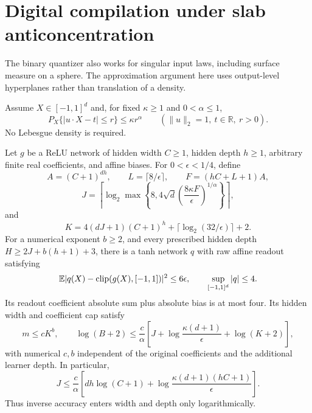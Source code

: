 \section{Digital compilation under slab anticoncentration}
\label{sec:slab-quantized-input}
The binary quantizer also works for singular input laws, including
surface measure on a sphere. The approximation argument here uses
output-level hyperplanes rather than translation of a density.

Assume $X\in[-1,1]^d$ and, for fixed $\kappa\ge1$ and
$0<\alpha\le1$,
\begin{equation}\label{eq:digital-slab-assumption}
 P_X\{|u\cdot X-t|\le r\}\le\kappa r^\alpha
 \qquad(\|u\|_2=1,\ t\in\mathbb R,\ r>0).
\end{equation}
No Lebesgue density is required.

\begin{lemma}
\label{lem:slab-quantized-compiler}
Let $g$ be a ReLU network of hidden width $C\ge1$, hidden depth
$h\ge1$, arbitrary finite real coefficients, and affine biases.
For $0<\epsilon<1/4$, define
\[
 A=(C+1)^{dh},\qquad L=\lceil8/\epsilon\rceil,
 \qquad F=(hC+L+1)A,
\]
\[
 J=\left\lceil\log_2\max\left\{8,
       4\sqrt d\left(\frac{8\kappa F}{\epsilon}\right)^{1/\alpha}
                          \right\}\right\rceil,
\]
and
\[
 K=4(dJ+1)(C+1)^h+\lceil\log_2(32/\epsilon)\rceil+2.
\]
For a numerical exponent $b\ge2$, and every prescribed hidden depth
$H\ge2J+b(h+1)+3$, there is a tanh network $q$ with raw affine
readout satisfying
\[
 \mathbb E|q(X)-\operatorname{clip}(g(X),[-1,1])|^2\le6\epsilon,
 \qquad \sup_{[-1,1]^d}|q|\le4.
\]
Its readout coefficient absolute sum plus absolute bias is at most
four. Its hidden width and coefficient cap satisfy
\[
 m\le c K^b,\qquad
 \log(B+2)\le\frac c\alpha
   \left[J+\log\frac{\kappa(d+1)}\epsilon+\log(K+2)\right],
\]
with numerical $c,b$ independent of the original coefficients and
the additional learner depth. In particular,
\[
 J\le\frac c\alpha
   \left[dh\log(C+1)
           +\log\frac{\kappa(d+1)(hC+1)}\epsilon\right].
\]
Thus inverse accuracy enters width and depth only logarithmically.
\end{lemma}

